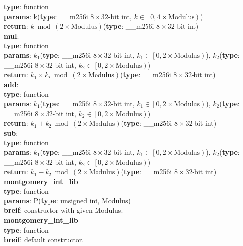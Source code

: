 \documentclass[8pt, a4paper, oneside, twocolumn]{article}
\begin{document}
\indent\textbf{type}: function\\
\indent\textbf{params}: k(\textbf{type}: \_\_m256i $8\times 32$-bit int, $k\in \left[0,4\times \mathrm{Modulus}\right)$)\\
\indent\textbf{return}: $k\bmod \left(2\times\mathrm{Modulus}\right)$(\textbf{type}: \_\_m256i $8\times 32$-bit int)\\
\textbf{mul}:\\
\indent\textbf{type}: function\\
\indent\textbf{params}: $k_1$(\textbf{type}: \_\_m256i $8\times 32$-bit int, $k_1\in \left[0,2\times \mathrm{Modulus}\right)$), $k_2$(\textbf{type}: \_\_m256i $8\times 32$-bit int, $k_2\in \left[0,2\times \mathrm{Modulus}\right)$)\\
\indent\textbf{return}: $k_1\times k_2\bmod \left(2\times\mathrm{Modulus}\right)$(\textbf{type}: \_\_m256i $8\times 32$-bit int)\\
\textbf{add}:\\
\indent\textbf{type}: function\\
\indent\textbf{params}: $k_1$(\textbf{type}: \_\_m256i $8\times 32$-bit int, $k_1\in \left[0,2\times \mathrm{Modulus}\right)$), $k_2$(\textbf{type}: \_\_m256i $8\times 32$-bit int, $k_2\in \left[0,2\times \mathrm{Modulus}\right)$)\\
\indent\textbf{return}: $k_1+ k_2\bmod \left(2\times\mathrm{Modulus}\right)$(\textbf{type}: \_\_m256i $8\times 32$-bit int)\\
\textbf{sub}:\\
\indent\textbf{type}: function\\
\indent\textbf{params}: $k_1$(\textbf{type}: \_\_m256i $8\times 32$-bit int, $k_1\in \left[0,2\times \mathrm{Modulus}\right)$), $k_2$(\textbf{type}: \_\_m256i $8\times 32$-bit int, $k_2\in \left[0,2\times \mathrm{Modulus}\right)$)\\
\indent\textbf{return}: $k_1- k_2\bmod \left(2\times\mathrm{Modulus}\right)$(\textbf{type}: \_\_m256i $8\times 32$-bit int)\\
\textbf{montgomery\_int\_lib}\\
\indent\textbf{type}: function\\
\indent\textbf{params}: P(\textbf{type}: unsigned int, $\mathrm{Modulus}$)\\
\indent\textbf{breif}: constructor with given Modulus.\\
\textbf{montgomery\_int\_lib}\\
\indent\textbf{type}: function\\
\indent\textbf{breif}: default constructor.\\
\end{document}
